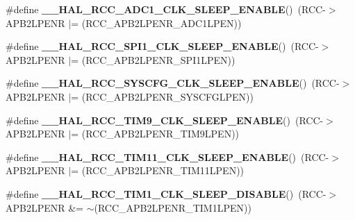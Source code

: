 \begin{DoxyCompactItemize}
\#define {\bfseries \+\_\+\+\_\+\+H\+A\+L\+\_\+\+R\+C\+C\+\_\+\+A\+D\+C1\+\_\+\+C\+L\+K\+\_\+\+S\+L\+E\+E\+P\+\_\+\+E\+N\+A\+B\+LE}()~(R\+CC-\/$>$A\+P\+B2\+L\+P\+E\+NR $\vert$= (R\+C\+C\+\_\+\+A\+P\+B2\+L\+P\+E\+N\+R\+\_\+\+A\+D\+C1\+L\+P\+EN))
\item 
\mbox{\label{group___r_c_c___a_p_b2___low_power___enable___disable_ga41997855b2cc7563c8ed0c9873d32daf}} 
\#define {\bfseries \+\_\+\+\_\+\+H\+A\+L\+\_\+\+R\+C\+C\+\_\+\+S\+P\+I1\+\_\+\+C\+L\+K\+\_\+\+S\+L\+E\+E\+P\+\_\+\+E\+N\+A\+B\+LE}()~(R\+CC-\/$>$A\+P\+B2\+L\+P\+E\+NR $\vert$= (R\+C\+C\+\_\+\+A\+P\+B2\+L\+P\+E\+N\+R\+\_\+\+S\+P\+I1\+L\+P\+EN))
\item 
\mbox{\label{group___r_c_c___a_p_b2___low_power___enable___disable_ga6e3a8ca9e554e3aa7aba57d034725655}} 
\#define {\bfseries \+\_\+\+\_\+\+H\+A\+L\+\_\+\+R\+C\+C\+\_\+\+S\+Y\+S\+C\+F\+G\+\_\+\+C\+L\+K\+\_\+\+S\+L\+E\+E\+P\+\_\+\+E\+N\+A\+B\+LE}()~(R\+CC-\/$>$A\+P\+B2\+L\+P\+E\+NR $\vert$= (R\+C\+C\+\_\+\+A\+P\+B2\+L\+P\+E\+N\+R\+\_\+\+S\+Y\+S\+C\+F\+G\+L\+P\+EN))
\item 
\mbox{\label{group___r_c_c___a_p_b2___low_power___enable___disable_ga8fb59f888889fc998d1f7e64e370c9d1}} 
\#define {\bfseries \+\_\+\+\_\+\+H\+A\+L\+\_\+\+R\+C\+C\+\_\+\+T\+I\+M9\+\_\+\+C\+L\+K\+\_\+\+S\+L\+E\+E\+P\+\_\+\+E\+N\+A\+B\+LE}()~(R\+CC-\/$>$A\+P\+B2\+L\+P\+E\+NR $\vert$= (R\+C\+C\+\_\+\+A\+P\+B2\+L\+P\+E\+N\+R\+\_\+\+T\+I\+M9\+L\+P\+EN))
\item 
\mbox{\label{group___r_c_c___a_p_b2___low_power___enable___disable_ga2d808a429ceb72c79908770e79ff3cfa}} 
\#define {\bfseries \+\_\+\+\_\+\+H\+A\+L\+\_\+\+R\+C\+C\+\_\+\+T\+I\+M11\+\_\+\+C\+L\+K\+\_\+\+S\+L\+E\+E\+P\+\_\+\+E\+N\+A\+B\+LE}()~(R\+CC-\/$>$A\+P\+B2\+L\+P\+E\+NR $\vert$= (R\+C\+C\+\_\+\+A\+P\+B2\+L\+P\+E\+N\+R\+\_\+\+T\+I\+M11\+L\+P\+EN))
\item 
\mbox{\label{group___r_c_c___a_p_b2___low_power___enable___disable_ga990bf7664ac6c430c239eab292ec7ed5}} 
\#define {\bfseries \+\_\+\+\_\+\+H\+A\+L\+\_\+\+R\+C\+C\+\_\+\+T\+I\+M1\+\_\+\+C\+L\+K\+\_\+\+S\+L\+E\+E\+P\+\_\+\+D\+I\+S\+A\+B\+LE}()~(R\+CC-\/$>$A\+P\+B2\+L\+P\+E\+NR \&= $\sim$(R\+C\+C\+\_\+\+A\+P\+B2\+L\+P\+E\+N\+R\+\_\+\+T\+I\+M1\+L\+P\+EN))

\end{DoxyCompactItemize}
